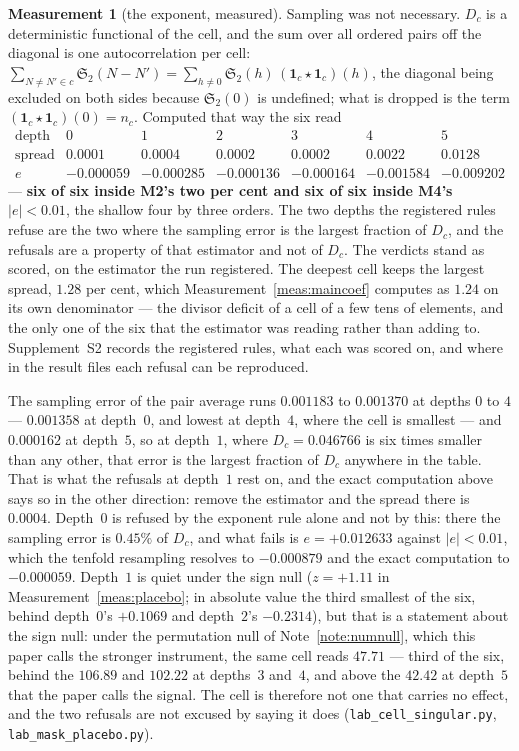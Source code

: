 \documentclass[11pt,a4paper]{article}
\theoremstyle{plain}
\theoremstyle{definition}
\newtheorem{measurement}[theorem]{Measurement}
\theoremstyle{remark}
\renewcommand{\SS}{\mathfrak{S}}
\begin{document}
\begin{measurement}[the exponent, measured]
Sampling was not necessary. $D_c$ is a deterministic functional of the
cell, and the sum over all ordered pairs off the diagonal is one
autocorrelation per cell:
$\sum_{N\neq N'\in c}\SS_2(N-N')
=\sum_{h\neq0}\SS_2(h)\,(\mathbf 1_c\star\mathbf 1_c)(h)$, the
diagonal being excluded on both sides because $\SS_2(0)$ is undefined;
what is dropped is the term $(\mathbf 1_c\star\mathbf 1_c)(0)=n_c$.
Computed that way
the six read
\[
\begin{array}{r|cccccc}
 \text{depth} & 0 & 1 & 2 & 3 & 4 & 5\\\hline
 \text{spread} & 0.0001 & 0.0004 & 0.0002 & 0.0002 & 0.0022 & 0.0128\\
 e & -0.000059 & -0.000285 & -0.000136 & -0.000164 & -0.001584
   & -0.009202
\end{array}
\]
--- \textbf{six of six inside M2's two per cent and six of six inside
M4's $|e|<0.01$}, the shallow four by three orders. The two depths the
registered rules refuse are the two where the sampling error is the
largest fraction of $D_c$, and the refusals are a property of that
estimator and not of $D_c$. The verdicts stand as scored, on the
estimator the run registered. The deepest cell keeps the largest
spread, $1.28$ per cent, which Measurement~\ref{meas:maincoef}
computes as $1.24$ on its own denominator --- the divisor deficit of a
cell of a few tens of elements, and the only one of the six that the
estimator was reading rather than adding to. Supplement~S2 records the
registered rules, what each was scored on, and where in the result
files each refusal can be reproduced.

The sampling error of the pair average runs $0.001183$ to $0.001370$
at depths $0$ to $4$ --- $0.001358$ at depth~$0$, and lowest at
depth~$4$, where the cell is smallest --- and $0.000162$ at
depth~$5$, so at depth~$1$, where
$D_c=0.046766$ is six times smaller than any other, that error is the
largest fraction of $D_c$ anywhere in the table. That is what the
refusals at depth~$1$ rest on, and the exact computation above says so
in the other direction: remove the estimator and the spread there is
$0.0004$. Depth~$0$ is refused by the exponent rule alone and not by
this: there the sampling error is $0.45\%$ of $D_c$, and what fails is
$e=+0.012633$ against $|e|<0.01$, which the tenfold resampling
resolves to $-0.000879$ and the exact computation to $-0.000059$.
Depth~$1$ is quiet under
the sign null ($z=+1.11$ in Measurement~\ref{meas:placebo}; in
absolute value the third smallest of the six, behind depth~$0$'s
$+0.1069$ and depth~$2$'s $-0.2314$), but that is a
statement about the sign null: under the permutation null of
Note~\ref{note:numnull}, which this paper calls the stronger
instrument, the same cell reads $47.71$ --- third of the six, behind
the $106.89$ and $102.22$ at depths~$3$ and~$4$, and above the $42.42$
at depth~$5$ that the paper calls the signal. The cell is therefore not one that
carries no effect, and the two refusals are not excused by saying
it does (\texttt{lab\_cell\_singular.py},
\texttt{lab\_mask\_placebo.py}).
\end{measurement}
\end{document}
